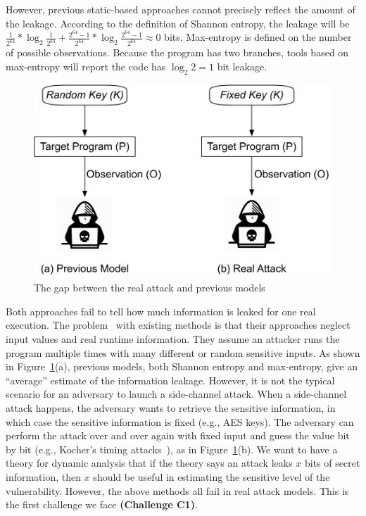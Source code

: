 However, previous static-based approaches cannot precisely reflect the amount of
the leakage. According to the definition of Shannon entropy, the leakage will be
$\frac{1}{2^{64}}*\log_{2}\frac{1}{2^{64}} + \frac{2^{64}-1}{2^{64}}
*\log_{2}\frac{2^{64}-1}{2^{64}} \approx 0$ bits. Max-entropy is defined on the
number of possible observations. Because the program has two
branches, tools based on max-entropy will report the code has $\log_2{2} = 1$
bit leakage.

\begin{figure}[h]
    \vspace*{-5pt}
    \centering
    \includegraphics[width=.65\columnwidth]{./figures/RA.pdf}
\vspace*{-2pt}
    \caption{The gap between the real attack and previous models}\label{fig:gap}
    \vspace*{-5pt}
\end{figure}

Both approaches fail to tell how much information is leaked for one real execution. 
The problem~\cite{Chattopadhyay:2017:QIL:3127041.3127044} with existing methods is that their approaches neglect input values and 
real runtime information. 
They assume an attacker runs the program multiple times with many different or 
random sensitive inputs. As
shown in Figure~\ref{fig:gap}(a), previous models, both Shannon entropy and max-entropy, 
give an ``average'' estimate of the information leakage. However, it is
not the typical scenario for an adversary to launch a side-channel attack. When
a side-channel attack happens, the adversary wants to retrieve the sensitive
information, in which case the sensitive information is fixed (e.g., AES keys).
The adversary can perform the attack over and over again with fixed input and 
guess the value bit by
bit (e.g., Kocher's timing attacks~\cite{kocher1996timing}), as in Figure~\ref{fig:gap}(b). 
We want to have a theory for dynamic analysis that if the theory says an attack leaks $x$ bits of
secret information, then $x$ should be useful in estimating the sensitive level of the vulnerability. 
However, the above methods all fail in real attack models. This is the first challenge we face
\textbf{(Challenge C1)}.

